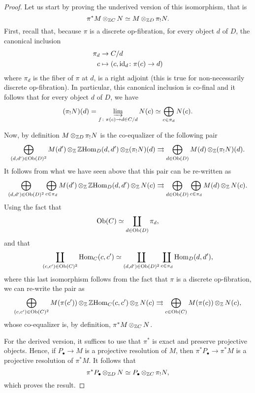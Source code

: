 \documentclass{amsart}
\newcommand{\id}{\mathrm{id}}
\renewcommand{\homset}[3]{\mathrm{Hom}_{#1}(#2,#3)}
\begin{document}
\begin{proof}
  Let us start by proving the underived version of this isomorphism,
  that is
  \[
   \pi^*M\operatorname{\otimes}_{\mathbb Z C} N \simeq M\operatorname{\otimes}_{\mathbb Z D}\pi_!N.
 \]
 First, recall that, because $\pi$ is a discrete op-fibration, for every
 object $d$ of $D$, the
 canonical inclusion
 \[
   \begin{aligned}
     \pi_d &\to \tr{C}{d}\\
     c &\mapsto (c,\id_{d} \colon \pi(c) \to d)
   \end{aligned}
 \]
 where $\pi_d$ is the fiber of $\pi$ at $d$, is a right adjoint (this
 is true for non-necessarily discrete op-fibration). In particular,
 this canonical inclusion is co-final and it follows that for every
 object $d$ of $D$, we have
 \[
   (\pi_!N)(d) = \varinjlim_{f \colon \pi(c) \to d \in C/d}N(c) \simeq
   \bigoplus_{c \in \pi_d}N(c).
 \]

 Now, by definition $M\operatorname{\otimes}_{\mathbb Z D}\pi_!N$ is the co-equalizer of the
 following pair
 \[
   \bigoplus_{(d,d') \in
     \Ob(D)^2}M(d')\tens_{\Z}\Z\homset{D}{d}{d'}\tens_{\Z}(\pi_!N)(d)
   \rightrightarrows \bigoplus_{d \in \Ob(D)}M(d)\tens_{\Z}(\pi_!N)(d).
 \]
 It follows from what we have seen above that this pair can be
 re-written as
 \[
   \bigoplus_{(d,d') \in
     \Ob(D)^2}\bigoplus_{c \in
     \pi_d}M(d')\tens_{\Z}\Z\homset{D}{d}{d'}\tens_{\Z}N(c)
   \rightrightarrows \bigoplus_{d \in \Ob(D)}\bigoplus_{c \in
     \pi_d}M(d)\tens_{\Z}N(c).
 \]
 Using the fact that \[\mathrm{Ob}(C)\simeq\coprod_{d \in \mathrm{Ob}(D)}\pi_d,\] and that
 \[
   \coprod_{(c,c')\in \Ob(C)^2}\homset{C}{c}{c'} \simeq
   \coprod_{(d,d') \in \Ob(D)^2}\coprod_{c\in \pi_d}\homset{D}{d}{d'},
 \]
 where this last isomorphism follows from the fact that $\pi$ is a
 discrete op-fibration, we can re-write the pair as
 \[
   \bigoplus_{(c,c') \in
     \Ob(C)^2}M(\pi(c'))\tens_{\Z}\Z\homset{C}{c}{c'}\tens_{\Z}N(c)\rightrightarrows
   \bigoplus_{c \in \Ob(C)}M(\pi(c))\tens_{\Z}N(c),
 \]
 whose co-equalizer is, by definition, $\pi^*M\operatorname{\otimes}_{\mathbb Z C}N$.

 For the derived version, it suffices to use that $\pi^*$ is exact and
 preserve projective objects. Hence, if $P_{\bullet} \to M$ is a projective
 resolution of $M$, then $\pi^*P_{\bullet} \to \pi^*M$ is a projective
 resolution of $\pi^*M$. It follows that
 \[
   \pi^*P_{\bullet}\operatorname{\otimes}_{\mathbb Z D}N \simeq P_{\bullet}\operatorname{\otimes}_{\mathbb Z C}\pi_!N,
 \]
 which proves the result.
\end{proof}
\end{document}
